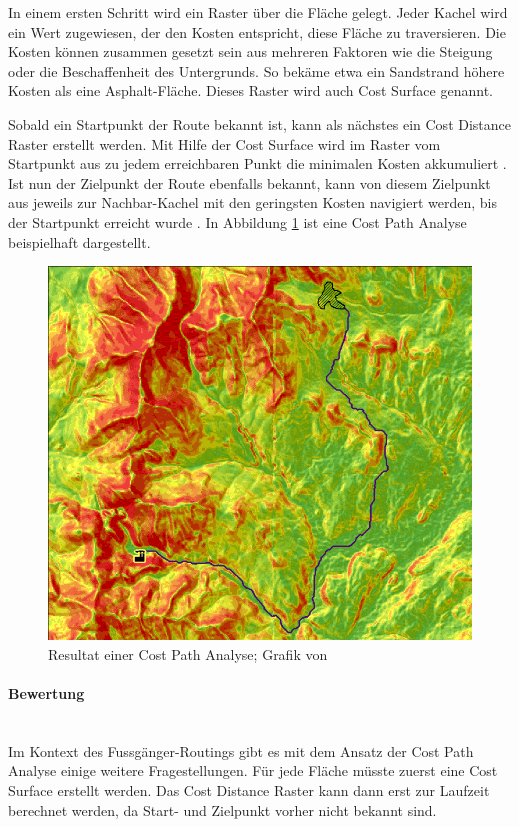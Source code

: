 In einem ersten Schritt wird ein Raster über die Fläche gelegt. Jeder Kachel wird ein Wert zugewiesen, der den Kosten entspricht, diese Fläche zu traversieren. Die Kosten können zusammen gesetzt sein aus mehreren Faktoren wie die Steigung oder die Beschaffenheit des Untergrunds. So bekäme etwa ein Sandstrand höhere Kosten als eine Asphalt-Fläche. Dieses Raster wird auch Cost Surface genannt. \cite{gid_fundamentals}

Sobald ein Startpunkt der Route bekannt ist, kann als nächstes ein Cost Distance Raster erstellt werden. Mit Hilfe der Cost Surface wird im Raster vom Startpunkt aus zu jedem erreichbaren Punkt die minimalen Kosten akkumuliert \cite{geospatial_analysis}. Ist nun der Zielpunkt der Route ebenfalls bekannt, kann von diesem Zielpunkt aus jeweils zur Nachbar-Kachel mit den geringsten Kosten navigiert werden, bis der Startpunkt erreicht wurde \cite{cost_path_analysis}. In Abbildung \ref{fig:cost_path_analysis} ist eine Cost Path Analyse beispielhaft dargestellt.


\begin{figure}[ht]
    \centering
    \includegraphics[width=0.6\linewidth]{technicalreport/img/cost_path_analysis}
    \caption[Cost Path Analyse]{Resultat einer Cost Path Analyse; Grafik von \cite{geospatial_analysis}}
    \label{fig:cost_path_analysis}
\end{figure}

\paragraph{Bewertung}~\\
Im Kontext des Fussgänger-Routings gibt es mit dem Ansatz der Cost Path Analyse einige weitere Fragestellungen. Für jede Fläche müsste zuerst eine Cost Surface erstellt werden. Das Cost Distance Raster kann dann erst zur Laufzeit berechnet werden, da Start- und Zielpunkt vorher nicht bekannt sind.

